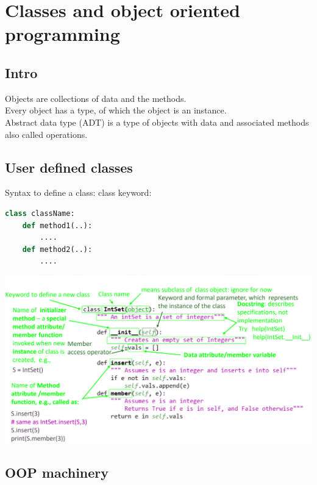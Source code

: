 \documentclass[12pt,oneside]{book}
\begin{document}
\chapter{Classes and object oriented programming}
\section{Intro}
Objects are collections of data and the methods.\\
Every object has a type, of which the object is an instance.\\

Abstract data type (ADT) is a type of objects with data and associated methods also called operations.
\section{User defined classes}
Syntax to define a class: class keyword:
{\small\begin{lstlisting}[language=python]
class className:
	def method1(..):
		....
	def method2(..):
		....
\end{lstlisting}}
\begin{center}
	\includegraphics[width=0.8\linewidth]{../pic/python/20.png}
\end{center}
\section{OOP machinery}
\end{document}
